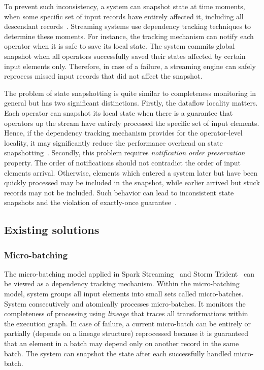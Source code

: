 To prevent such inconsistency, a system can snapshot state at time moments, when some specific set of input records have entirely affected it, including all descendant records~\cite{2015arXiv150608603C, thepaper}. Streaming systems use dependency tracking techniques to determine these moments. For instance, the tracking mechanism can notify each operator when it is safe to save its local state. The system commits global snapshot when all operators successfully saved their states affected by certain input elements only. Therefore, in case of a failure, a streaming engine can safely reprocess missed input records that did not affect the snapshot.

The problem of state snapshotting is quite similar to completeness monitoring in general but has two significant distinctions. Firstly, the dataflow locality matters. Each operator can snapshot its local state when there is a guarantee that operators up the stream have entirely processed the specific set of input elements. Hence, if the dependency tracking mechanism provides for the operator-level locality, it may significantly reduce the performance overhead on state snapshotting~\cite{Carbone:2017:SMA:3137765.3137777}. Secondly, this problem requires {\em notification order preservation} property. The order of notifications should not contradict the order of input elements arrival. Otherwise, elements which entered a system later but have been quickly processed may be included in the snapshot, while earlier arrived but stuck records may not be included. Such behavior can lead to inconsistent state snapshots and the violation of exactly-once guarantee~\cite{2015arXiv150608603C}. 

\subsection{Existing solutions} \label{existing_solutions}

\subsubsection{Micro-batching}

The micro-batching model applied in Spark Streaming~\cite{Zaharia:2012:DSE:2342763.2342773} and Storm Trident~\cite{apache:storm:trident} can be viewed as a dependency tracking mechanism. Within the micro-batching model, system groups all input elements into small sets called micro-batches. System consecutively and atomically processes micro-batches. It monitors the completeness of processing using {\em lineage} that traces all transformations within the execution graph. In case of failure, a current micro-batch can be entirely or partially (depends on a lineage structure) reprocessed because it is guaranteed that an element in a batch may depend only on another record in the same batch. The system can snapshot the state after each successfully handled micro-batch. 

